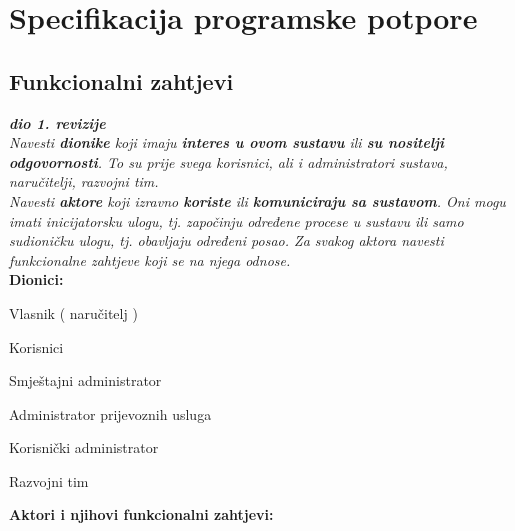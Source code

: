 \chapter{Specifikacija programske potpore}
		
	\section{Funkcionalni zahtjevi}
			
			\textbf{\textit{dio 1. revizije}}\\
			
			\textit{Navesti \textbf{dionike} koji imaju \textbf{interes u ovom sustavu} ili  \textbf{su nositelji odgovornosti}. To su prije svega korisnici, ali i administratori sustava, naručitelji, razvojni tim.}\\
				
			\textit{Navesti \textbf{aktore} koji izravno \textbf{koriste} ili \textbf{komuniciraju sa sustavom}. Oni mogu imati inicijatorsku ulogu, tj. započinju određene procese u sustavu ili samo sudioničku ulogu, tj. obavljaju određeni posao. Za svakog aktora navesti funkcionalne zahtjeve koji se na njega odnose.}\\
			
			
			\noindent \textbf{Dionici:}
			
			\begin{packed_enum}
				
				\item Vlasnik ( naručitelj )
				\item Korisnici
				\begin{packed_enum}
					\item Smještajni administrator 
					\item Administrator prijevoznih usluga 
					\item Korisnički administrator
				\end{packed_enum}			
				\item Razvojni tim 
				
			\end{packed_enum}
			
			\noindent \textbf{Aktori i njihovi funkcionalni zahtjevi:}
			
